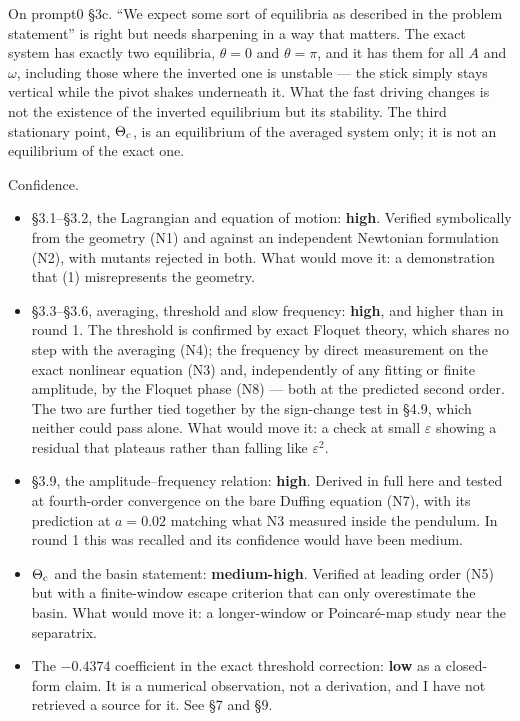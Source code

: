 \documentclass[11pt,a4paper]{article}
\providecommand{\tightlist}{\setlength{\itemsep}{0pt}\setlength{\parskip}{0pt}}
\begin{document}
On prompt0 §3c. ``We expect some sort of equilibria as described in the
problem statement'' is right but needs sharpening in a way that matters. The
exact system has exactly two equilibria, \(\theta=0\) and \(\theta=\pi\), and it has
them for all \(A\) and \(\omega\), including those where the inverted one is
unstable --- the stick simply stays vertical while the pivot shakes underneath it.
What the fast driving changes is not the existence of the inverted equilibrium
but its stability. The third stationary point, \(\Theta_{\rm c}\), is an
equilibrium of the averaged system only; it is not an equilibrium of the exact
one.

Confidence.

\begin{itemize}
\tightlist
\item
  §3.1--§3.2, the Lagrangian and equation of motion: \textbf{high}. Verified
  symbolically from the geometry (N1) and against an independent Newtonian
  formulation (N2), with mutants rejected in both. What would move it: a
  demonstration that (1) misrepresents the geometry.
\item
  §3.3--§3.6, averaging, threshold and slow frequency: \textbf{high}, and higher than
  in round 1. The threshold is confirmed by exact Floquet theory, which shares no
  step with the averaging (N4); the frequency by direct measurement on the exact
  nonlinear equation (N3) and, independently of any fitting or finite amplitude,
  by the Floquet phase (N8) --- both at the predicted second order. The two are
  further tied together by the sign-change test in §4.9, which neither could pass
  alone. What would move it: a check at small \(\varepsilon\) showing a residual
  that plateaus rather than falling like \(\varepsilon^2\).
\item
  §3.9, the amplitude--frequency relation: \textbf{high}. Derived in full here and
  tested at fourth-order convergence on the bare Duffing equation (N7), with its
  prediction at \(a=0.02\) matching what N3 measured inside the pendulum. In round
  1 this was recalled and its confidence would have been medium.
\item
  \(\Theta_{\rm c}\) and the basin statement: \textbf{medium-high}. Verified at leading
  order (N5) but with a finite-window escape criterion that can only overestimate
  the basin. What would move it: a longer-window or Poincaré-map study near the
  separatrix.
\item
  The \(-0.4374\) coefficient in the exact threshold correction: \textbf{low} as a
  closed-form claim. It is a numerical observation, not a derivation, and I have
  not retrieved a source for it. See §7 and §9.
\end{itemize}
\end{document}
